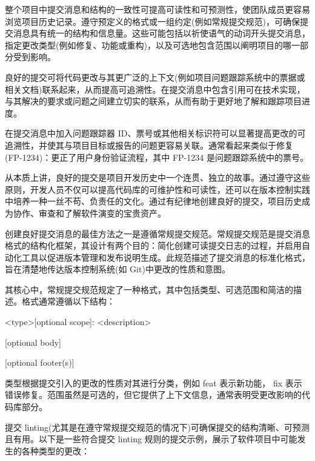 
整个项目中提交消息和结构的一致性可提高可读性和可预测性，使团队成员更容易浏览项目历史记录。遵守预定义的格式或一组约定(例如常规提交规范)，可确保提交消息具有统一的结构和信息量。这些可能包括以祈使语气的动词开头提交消息，指定更改类型(例如修复、功能或重构)，以及可选地包含范围以阐明项目的哪一部分受到影响。


良好的提交可将代码更改与其更广泛的上下文(例如项目问题跟踪系统中的票据或相关文档)联系起来，从而提高可追溯性。在提交消息中包含引用可在技术实现，与其解决的要求或问题之间建立切实的联系，从而有助于更好地了解和跟踪项目进度。

在提交消息中加入问题跟踪器 ID、票号或其他相关标识符可以显著提高更改的可追溯性，并使其与项目目标或报告的问题更容易关联。通常看起来类似于修复(FP-1234)：更正了用户身份验证流程，其中 FP-1234 是问题跟踪系统中的票号。

从本质上讲，良好的提交是项目开发历史中一个连贯、独立的故事。通过遵守这些原则，开发人员不仅可以提高代码库的可维护性和可读性，还可以在版本控制实践中培养一种一丝不苟、负责任的文化。通过有纪律地创建良好的提交，项目历史成为协作、审查和了解软件演变的宝贵资产。

创建良好提交消息的最佳方法之一是遵循常规提交规范。常规提交规范是提交消息格式的结构化框架，其设计有两个目的：简化创建可读提交日志的过程，并启用自动化工具以促进版本管理和发布说明生成。此规范描述了提交消息的标准化格式，旨在清楚地传达版本控制系统(如 Git)中更改的性质和意图。


其核心中，常规提交规范规定了一种格式，其中包括类型、可选范围和简洁的描述。格式通常遵循以下结构：

\begin{shell}
<type>[optional scope]: <description>

[optional body]

[optional footer(s)]
\end{shell}

类型根据提交引入的更改的性质对其进行分类，例如 feat 表示新功能， fix 表示错误修复。范围虽然是可选的，但它提供了上下文信息，通常表明受更改影响的代码库部分。


提交 linting(尤其是在遵守常规提交规范的情况下)可确保提交的结构清晰、可预测且有用。以下是一些符合提交 linting 规则的提交示例，展示了软件项目中可能发生的各种类型的更改：

